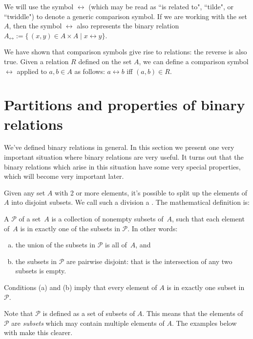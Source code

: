 We will use the symbol $\rel$ (which may be read as ``is related to", ``tilde", or ``twiddle") to denote a generic comparison symbol. If we are working with the set $A$, then the symbol $\rel$ also represents the binary relation $A_\rel := \{\, (x,y) \in A \times A \mid x \rel y \}$.

We have shown that comparison symbols give rise to relations: the reverse is also true. Given a relation $R$ defined on the set $A$, we can define a comparison symbol $\rel$ applied to $a,b \in A$ as follows:
$ a \rel b$ iff $(a,b) \in R$.

\section{Partitions and properties of binary relations  \quad{}} 
\label{sec:EquivalenceRelations:PartitionsAndProperties}

We've defined binary relations in general. In this section we present one very important situation where binary relations are very useful. It turns out that the binary relations which arise in this situation have some very special properties, which will become very important later.

Given any set $A$ with 2 or more elements, it's possible to split up the elements of $A$ into disjoint subsets. We call such a division a . The mathematical definition is:

\begin{defn}\label{def:Partition} A  $\mathcal{P}$ of a set~$A$ is a collection of nonempty subsets of~$A$, such that each element of~$A$ is in exactly one of the subsets in $\mathcal{P}$. In other words:
\begin{enumerate}[(a)]
\item the union of the subsets in $\mathcal{P}$ is all of~$A$,
and
\item the subsets in $\mathcal{P}$ are pairwise disjoint: that is the intersection of any two subsets is empty.
\end{enumerate}
Conditions (a) and (b) imply that every element of $A$ is in exactly one subset in $\mathcal{P}$.
\end{defn}

\begin{rem}
Note that $\mathcal{P}$ is defined as a set of subsets of $A$. This means that the elements of $\mathcal{P}$ are \emph{subsets} which may contain multiple elements of $A$. The examples below with make this clearer.
\end{rem}

